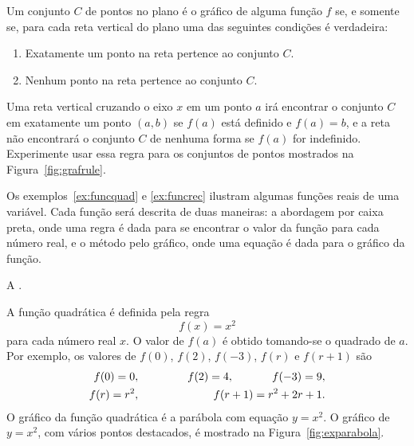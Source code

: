 Um conjunto $C$ de pontos no plano é o gráfico de alguma função $f$ se,
e somente se, para cada reta vertical do plano uma das seguintes
condições é verdadeira:
\begin{enumerate}[(1)]
\item Exatamente um ponto na reta pertence ao conjunto $C$.
\item Nenhum ponto na reta pertence ao conjunto $C$.
\end{enumerate}

Uma reta vertical cruzando o eixo $x$ em um ponto $a$ irá encontrar
o conjunto $C$ em exatamente um ponto $(a,b)$ se $f(a)$ está definido
e $f(a) = b$, e a reta não encontrará o conjunto $C$ de nenhuma forma
se $f(a)$ for indefinido. Experimente usar essa regra para os conjuntos
de pontos mostrados na Figura~\ref{fig:grafrule}.


Os exemplos~\ref{ex:funcquad} e \ref{ex:funcrec} ilustram algumas funções
reais de uma variável. Cada função será
descrita de duas maneiras: a abordagem por caixa preta, onde uma regra é
dada para se encontrar o valor da função para cada número real, e o método
pelo gráfico, onde uma equação é dada para o gráfico da função.

\begin{example}\label{ex:funcquad}
A .

A função quadrática é definida pela regra
\[
  f(x) = x^2
\]
para cada número real $x$. O valor de $f(a)$ é obtido tomando-se o
quadrado de $a$. Por exemplo, os valores de $f(0)$, $f(2)$, $f(-3)$,
$f(r)$ e $f(r+1)$ são
\begin{eqnarray*}
   f(0) = 0, && \hspace{0.1\textwidth} f(2) = 4,
  \hspace{0.1\textwidth} f(-3) = 9,  \\
 f(r) = r^2, && \hspace{0.1\textwidth} f(r+1) = r^2 + 2r + 1.
\end{eqnarray*}
O gráfico da função quadrática é a parábola com equação $y = x^2$.
O gráfico de $y = x^2$, com vários pontos destacados, é mostrado
na Figura~\ref{fig:exparabola}.
\end{example}


